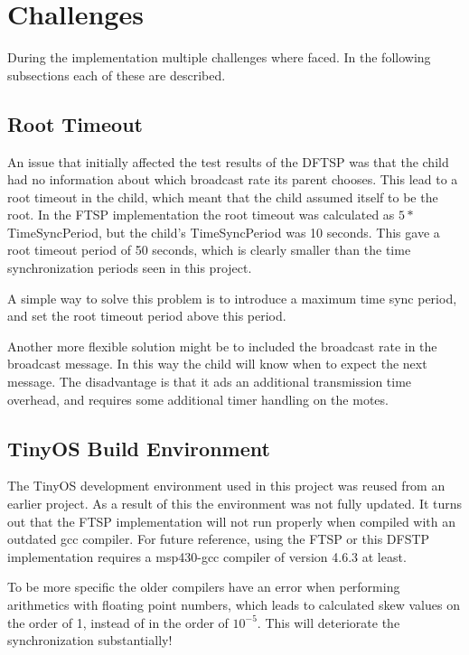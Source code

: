 \documentclass[Main]{subfiles}
\begin{document}
\section{Challenges} %
\label{sec:challenges}

	During the implementation multiple challenges where faced. In the following subsections each of these are described.

	\subsection{Root Timeout} %
	\label{sub:root_timeout}
		An issue that initially affected the test results of the DFTSP was that the child had no information about which broadcast rate its parent chooses. 
		This lead to a root timeout in the child, which meant that the child assumed itself to be the root. 
		In the FTSP implementation the root timeout was calculated as $5*$TimeSyncPeriod, but the child's TimeSyncPeriod was 10 seconds. 
		This gave a root timeout period of 50 seconds, which is clearly smaller than the time synchronization periods seen in this project.

		A simple way to solve this problem is to introduce a maximum time sync period, and set the root timeout period above this period.

		Another more flexible solution might be to included the broadcast rate in the broadcast message. 
		In this way the child will know when to expect the next message.
		The disadvantage is that it ads an additional transmission time overhead, and requires some additional timer handling on the motes.

	\subsection{TinyOS Build Environment} %
	\label{sub:tinyos_build_environment}
		The TinyOS development environment used in this project was reused from an earlier project. 
		As a result of this the environment was not fully updated.
		It turns out that the FTSP implementation will not run properly when compiled with an outdated gcc compiler.
		For future reference, using the FTSP or this DFSTP implementation requires a msp430-gcc compiler of version 4.6.3 at least.

		To be more specific the older compilers have an error when performing arithmetics with floating point numbers, which leads to calculated skew values on the order of 1, instead of in the order of $10^{-5}$.
		This will deteriorate the synchronization substantially! 

\end{document}
